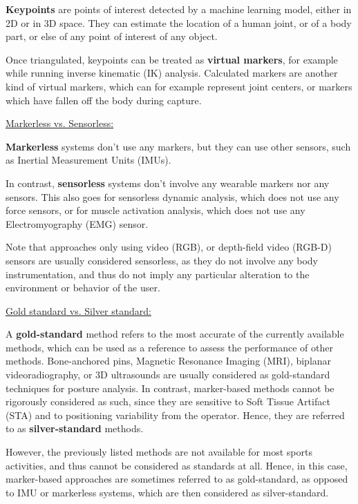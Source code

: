 \textbf{Keypoints} are points of interest detected by a machine learning model, either in 2D or in 3D space. They can estimate the location of a human joint, or of a body part, or else of any point of interest of any object.

Once triangulated, keypoints can be treated as \textbf{virtual markers}, for example while running inverse kinematic (IK) analysis. Calculated markers are another kind of virtual markers, which can for example represent joint centers, or markers which have fallen off the body during capture.

\vspace*{0.5cm}

\noindent\underline{Markerless vs. Sensorless:}

\textbf{Markerless} systems don't use any markers, but they can use other sensors, such as Inertial Measurement Units (IMUs). 

In contrast, \textbf{sensorless} systems don't involve any wearable markers nor any sensors. This also goes for sensorless dynamic analysis, which does not use any force sensors, or for muscle activation analysis, which does not use any Electromyography (EMG) sensor. 

Note that approaches only using video (RGB), or depth-field video (RGB-D) sensors are usually considered sensorless, as they do not involve any body instrumentation, and thus do not imply any particular alteration to the environment or behavior of the user.

\vspace*{0.5cm}

\noindent\underline{Gold standard vs. Silver standard:}

A \textbf{gold-standard} method refers to the most accurate of the currently available methods, which can be used as a reference to assess the performance of other methods. Bone-anchored pins, Magnetic Resonance Imaging (MRI), biplanar videoradiography, or 3D ultrasounds are usually considered as gold-standard techniques for posture analysis. In contrast, marker-based methods cannot be rigorously considered as such, since they are sensitive to Soft Tissue Artifact (STA) and to positioning variability from the operator. Hence, they are referred to as \textbf{silver-standard} methods. 

However, the previously listed methods are not available for most sports activities, and thus cannot be considered as standards at all. Hence, in this case, marker-based approaches are sometimes referred to as gold-standard, as opposed to IMU or markerless systems, which are then considered as silver-standard.

